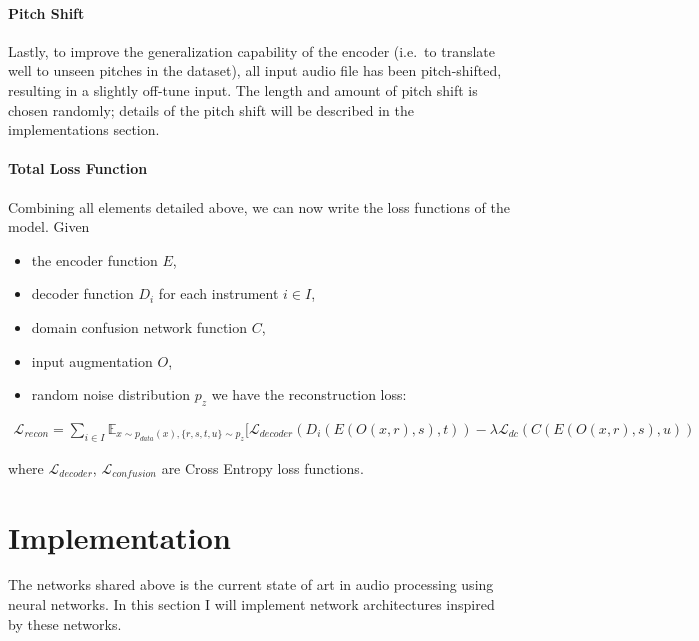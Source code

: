 \documentclass[]{article}
\providecommand{\tightlist}{%
  \setlength{\itemsep}{0pt}\setlength{\parskip}{0pt}}
\begin{document}
\hypertarget{pitch-shift}{%
\paragraph{Pitch Shift}\label{pitch-shift}}

Lastly, to improve the generalization capability of the encoder (i.e.~to
translate well to unseen pitches in the dataset), all input audio file
has been pitch-shifted, resulting in a slightly off-tune input. The
length and amount of pitch shift is chosen randomly; details of the
pitch shift will be described in the implementations section.

\hypertarget{total-loss-function}{%
\paragraph{Total Loss Function}\label{total-loss-function}}

Combining all elements detailed above, we can now write the loss
functions of the model. Given

\begin{itemize}
\tightlist
\item
  the encoder function \(E\),
\item
  decoder function \(D_i\) for each instrument \(i \in I\),
\item
  domain confusion network function \(C\),
\item
  input augmentation \(O\),
\item
  random noise distribution \(p_z\) we have the reconstruction loss:
\end{itemize}

\begin{multline}
    \mathcal{L}_{recon} = \sum_{i \in I} \mathbb{E}_{x \sim p_{data}(x), \{r, s, t, u\} \sim p_{z}} [ \mathcal{L}_{decoder}(D_i(E(O(x, r), s), t))  - \lambda \mathcal{L}_{dc}(C(E(O(x, r), s), u))
\end{multline}

where \(\mathcal{L}_{decoder}\), \(\mathcal{L}_{confusion}\) are Cross
Entropy loss functions.

\hypertarget{implementation}{%
\section{Implementation}\label{implementation}}

The networks shared above is the current state of art in audio
processing using neural networks. In this section I will implement
network architectures inspired by these networks.
\end{document}
